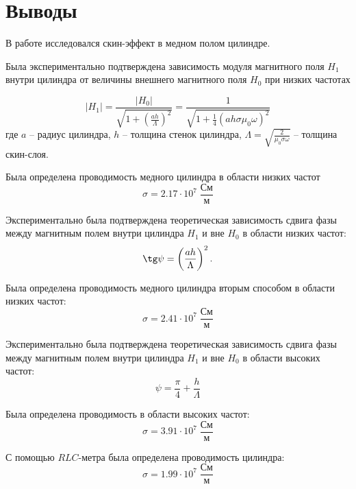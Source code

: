 \section*{Выводы}

В работе исследовался скин-эффект в медном полом цилиндре.

Была экспериментально подтверждена зависимость модуля магнитного поля $H_1$ внутри цилиндра от величины внешнего магнитного поля $H_0$ при низких частотах 

$$
|H_1| = \frac{|H_0|}{\sqrt{1 + \left( \frac{ah}{\Lambda} \right)^2}} = \frac{1}{\sqrt{1 + \frac{1}{4} \left( a h \sigma \mu_0 \omega \right)^2}}
$$
где $a$ -- радиус цилиндра, $h$ -- толщина стенок цилиндра, $\Lambda = \sqrt{\frac{2}{\mu_0 \sigma \omega}}$ -- толщина скин-слоя.

Была определена проводимость медного цилиндра в области низких частот $$
\sigma = 2.17 \cdot 10^7 \; \frac{См}{м}
$$

Экспериментально была подтверждена теоретическая зависимость сдвига фазы между магнитным полем внутри цилиндра $H_1$ и вне $H_0$ в области низких частот:
$$
\tg \psi = \left( \frac{ah}{\Lambda} \right)^2.
$$

Была определена проводимость медного цилиндра вторым способом в области низких частот:
$$
\sigma = 2.41 \cdot 10^7 \; \frac{См}{м}
$$

Экспериментально была подтверждена теоретическая зависимость сдвига фазы между магнитным полем внутри цилиндра $H_1$ и вне $H_0$ в области высоких частот:
$$
\psi = \frac{\pi}{4} + \frac{h}{\Lambda}
$$

Была определена проводимость в области высоких частот:
$$
\sigma = 3.91 \cdot 10^7 \; \frac{\text{См}}{\text{м}}
$$

С помощью $RLC$-метра была определена проводимость цилиндра:
$$
\sigma = 1.99 \cdot 10^7 \; \frac{\text{См}}{\text{м}}
$$

